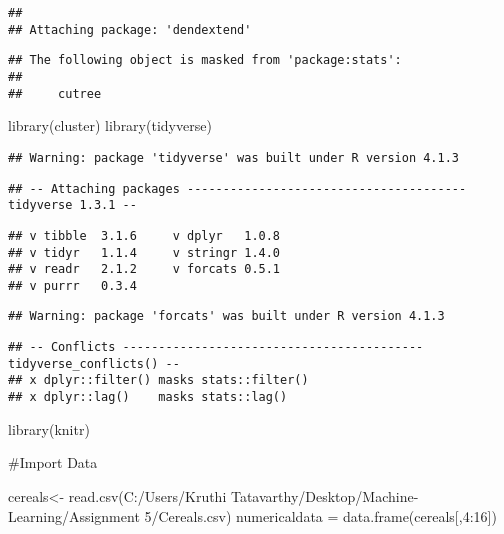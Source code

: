 \documentclass[
]{article}
\newenvironment{Shaded}{\begin{snugshade}}{\end{snugshade}}
\newcommand{\DecValTok}[1]{\textcolor[rgb]{0.00,0.00,0.81}{#1}}
\newcommand{\FunctionTok}[1]{\textcolor[rgb]{0.00,0.00,0.00}{#1}}
\newcommand{\NormalTok}[1]{#1}
\newcommand{\OtherTok}[1]{\textcolor[rgb]{0.56,0.35,0.01}{#1}}
\newcommand{\SpecialCharTok}[1]{\textcolor[rgb]{0.00,0.00,0.00}{#1}}
\newcommand{\StringTok}[1]{\textcolor[rgb]{0.31,0.60,0.02}{#1}}
\begin{document}
\begin{verbatim}
## 
## Attaching package: 'dendextend'
\end{verbatim}

\begin{verbatim}
## The following object is masked from 'package:stats':
## 
##     cutree
\end{verbatim}

\begin{Shaded}
\begin{Highlighting}[]
\FunctionTok{library}\NormalTok{(cluster)}
\FunctionTok{library}\NormalTok{(tidyverse)}
\end{Highlighting}
\end{Shaded}

\begin{verbatim}
## Warning: package 'tidyverse' was built under R version 4.1.3
\end{verbatim}

\begin{verbatim}
## -- Attaching packages --------------------------------------- tidyverse 1.3.1 --
\end{verbatim}

\begin{verbatim}
## v tibble  3.1.6     v dplyr   1.0.8
## v tidyr   1.1.4     v stringr 1.4.0
## v readr   2.1.2     v forcats 0.5.1
## v purrr   0.3.4
\end{verbatim}

\begin{verbatim}
## Warning: package 'forcats' was built under R version 4.1.3
\end{verbatim}

\begin{verbatim}
## -- Conflicts ------------------------------------------ tidyverse_conflicts() --
## x dplyr::filter() masks stats::filter()
## x dplyr::lag()    masks stats::lag()
\end{verbatim}

\begin{Shaded}
\begin{Highlighting}[]
\FunctionTok{library}\NormalTok{(knitr)}
\end{Highlighting}
\end{Shaded}

\#Import Data

\begin{Shaded}
\begin{Highlighting}[]
\NormalTok{cereals}\OtherTok{\textless{}{-}} \FunctionTok{read.csv}\NormalTok{(}\StringTok{\textquotesingle{}C:/Users/Kruthi Tatavarthy/Desktop/Machine{-}Learning/Assignment 5/Cereals.csv\textquotesingle{}}\NormalTok{)}
\NormalTok{numericaldata }\OtherTok{=} \FunctionTok{data.frame}\NormalTok{(cereals[,}\DecValTok{4}\SpecialCharTok{:}\DecValTok{16}\NormalTok{])}
\end{Highlighting}
\end{Shaded}
\end{document}
